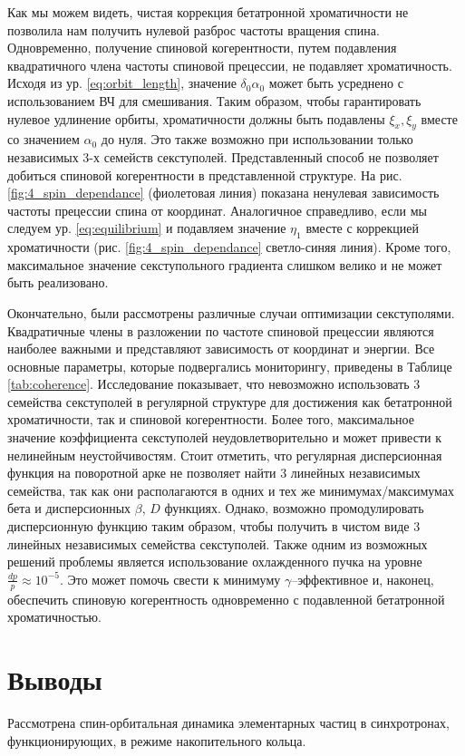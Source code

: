 \par Как мы можем видеть, чистая коррекция бетатронной хроматичности не позволила нам получить нулевой разброс частоты вращения спина. Одновременно, получение спиновой когерентности, путем подавления квадратичного члена частоты спиновой прецессии, не подавляет хроматичность. Исходя из ур. \ref{eq:orbit_length}, значение $\delta_0\alpha_0$ может быть усреднено с использованием ВЧ для смешивания. Таким образом, чтобы гарантировать нулевое удлинение орбиты, хроматичности должны быть подавлены $\xi_x,\xi_y$ вместе со значением $\alpha_0$ до нуля. Это также возможно при использовании только независимых 3-х семейств секступолей. Представленный способ не позволяет добиться спиновой когерентности в представленной структуре. На рис. \ref{fig:4_spin_dependance} (фиолетовая линия) показана ненулевая зависимость частоты прецессии спина от координат. Аналогичное справедливо, если мы следуем ур. \ref{eq:equilibrium} и подавляем значение $\eta_1$ вместе с коррекцией хроматичности (рис. \ref{fig:4_spin_dependance} светло-синяя линия). Кроме того, максимальное значение секступольного градиента слишком велико и не может быть реализовано.

\par Окончательно, были рассмотрены различные случаи оптимизации секступолями. Квадратичные члены в разложении по частоте спиновой прецессии являются наиболее важными и представляют зависимость от координат и энергии. Все основные параметры, которые подвергались мониторингу, приведены в Таблице \ref{tab:coherence}. Исследование показывает, что невозможно использовать 3 семейства секступолей в регулярной структуре для достижения как бетатронной хроматичности, так и спиновой когерентности. Более того, максимальное значение коэффициента секступолей неудовлетворительно и может привести к нелинейным неустойчивостям. Стоит отметить, что регулярная дисперсионная функция на поворотной арке не позволяет найти 3 линейных независимых семейства, так как они располагаются в одних и тех же минимумах/максимумах бета и дисперсионных $\beta$, $D$ функциях. Однако, возможно промодулировать дисперсионную функцию таким образом, чтобы получить в чистом виде 3 линейных независимых семейства секступолей. Также одним из возможных решений проблемы является использование охлажденного пучка на уровне $\frac{dp}{p}\approx{10}^{-5}$. Это может помочь свести к минимуму $\gamma$–эффективное и, наконец, обеспечить спиновую когерентность одновременно с подавленной бетатронной хроматичностью.

	\section*{Выводы}
\par Рассмотрена спин-орбитальная динамика элементарных частиц в синхротронах, функционирующих, в режиме накопительного кольца. 

